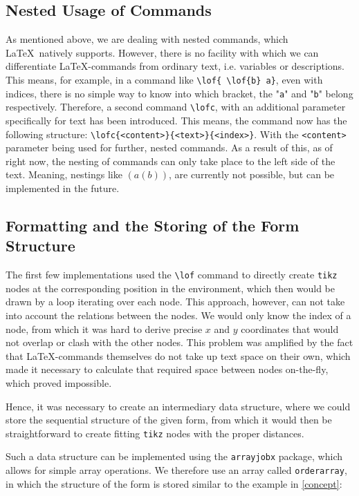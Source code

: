 \documentclass[12pt]{article}
\begin{document}
\subsection{Nested Usage of Commands}\label{nesting}

As mentioned above, we are dealing with nested commands, which \LaTeX~natively supports. However, there is no facility with which we can differentiate \LaTeX-commands from ordinary text, i.e. variables or descriptions. This means, for example, in a command like \texttt{\textbackslash lof\{ \textbackslash lof\{b\} a\}}, even with indices, there is no simple way to know into which bracket, the "\texttt{a}" and "\texttt{b}" belong respectively. Therefore, a second command \texttt{\textbackslash lofc}, with an additional parameter specifically for text has been introduced. This means, the command now has the following structure: \texttt{\textbackslash lofc\{<content>\}\{<text>\}\{<index>\}}. With the \texttt{<content>} parameter being used for further, nested commands. As a result of this, as of right now, the nesting of commands can only take place to the left side of the text. Meaning, nestings like $(a(b))$, are currently not possible, but can be implemented in the future.

\subsection{Formatting and the Storing of the Form Structure}\label{formatting}

The first few implementations used the \texttt{\textbackslash lof} command to directly create \texttt{tikz} nodes at the corresponding position in the environment, which then would be drawn by a loop iterating over each node. This approach, however, can not take into account the relations between the nodes. We would only know the index of a node, from which it was hard to derive precise $x$ and $y$ coordinates that would not overlap or clash with the other nodes. This problem was amplified by the fact that \LaTeX-commands themselves do not take up text space on their own, which made it necessary to calculate that required space between nodes on-the-fly, which proved impossible.

Hence, it was necessary to create an intermediary data structure, where we could store the sequential structure of the given form, from which it would then be straightforward to create fitting \texttt{tikz} nodes with the proper distances.

Such a data structure can be implemented using the \texttt{arrayjobx}\cite{arrayjobx} package, which allows for simple array operations. We therefore use an array called \texttt{orderarray}, in which the structure of the form is stored similar to the example in \ref{concept}:
\end{document}
